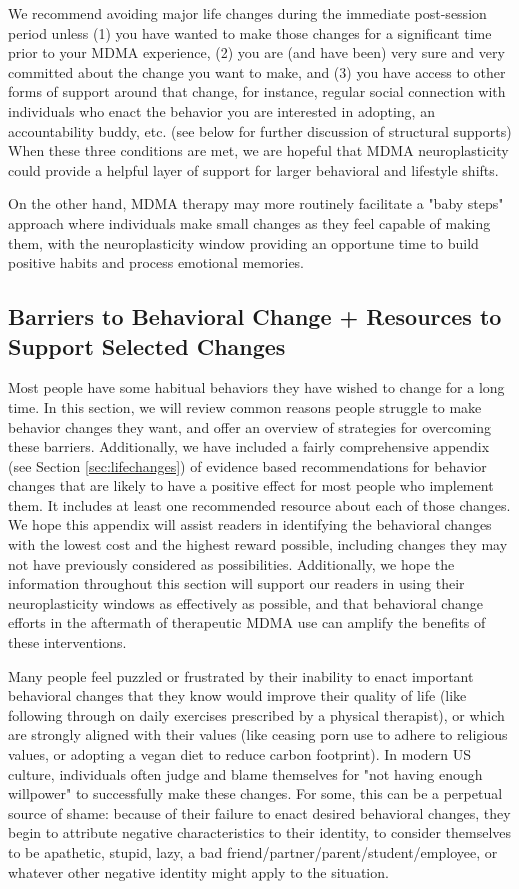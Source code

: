 \documentclass[12pt,letterpaper]{book}
\begin{document}
We recommend avoiding major life changes during the immediate post-session period unless (1) you have wanted to make those changes for a significant time prior to your MDMA experience, (2) you are (and have been) very sure and very committed about the change you want to make, and (3) you have access to other forms of support around that change, for instance, regular social connection with individuals who enact the behavior you are interested in adopting, an accountability buddy, etc. (see below for further discussion of structural supports) When these three conditions are met, we are hopeful that MDMA neuroplasticity could provide a helpful layer of support for larger behavioral and lifestyle shifts.

On the other hand, MDMA therapy may more routinely facilitate a "baby steps" approach where individuals make small changes as they feel capable of making them, with the neuroplasticity window providing an opportune time to build positive habits and process emotional memories.

\subsection*{Barriers to Behavioral Change + Resources to Support Selected Changes}

Most people have some habitual behaviors they have wished to change for a long time. In this section, we will review common reasons people struggle to make behavior changes they want, and offer an overview of strategies for overcoming these barriers. Additionally, we have included a fairly comprehensive appendix (see Section \ref{sec:lifechanges}) of evidence based recommendations for behavior changes that are likely to have a positive effect for most people who implement them. It includes at least one recommended resource about each of those changes. We hope this appendix will assist readers in identifying the behavioral changes with the lowest cost and the highest reward possible, including changes they may not have previously considered as possibilities. Additionally, we hope the information throughout this section will support our readers in using their neuroplasticity windows as effectively as possible, and that behavioral change efforts in the aftermath of therapeutic MDMA use can amplify the benefits of these interventions.

Many people feel puzzled or frustrated by their inability to enact important behavioral changes that they know would improve their quality of life (like following through on daily exercises prescribed by a physical therapist), or which are strongly aligned with their values (like ceasing porn use to adhere to religious values, or adopting a vegan diet to reduce carbon footprint). In modern US culture, individuals often judge and blame themselves for "not having enough willpower" to successfully make these changes. For some, this can be a perpetual source of shame: because of their failure to enact desired behavioral changes, they begin to attribute negative characteristics to their identity, to consider themselves to be apathetic, stupid, lazy, a bad friend/partner/parent/student/employee, or whatever other negative identity might apply to the situation.
\end{document}

